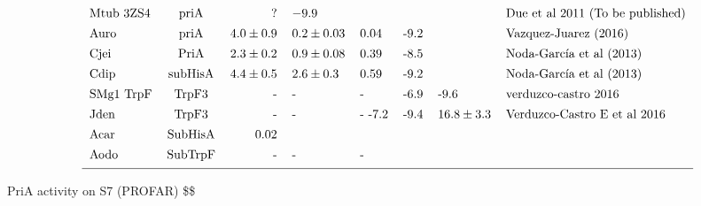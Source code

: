 \documentclass[12pt,twoside]{reedthesis}
\begin{document}
\[\begin{tabular}{ l c r l l l l l}
  Mtub 3ZS4   &priA   &$  ?                 $&$-9.9               $&                      &       &          &Due et al 2011 (To be published)\\ [1ex]
  Auro        &priA   &$  4.0 \pm 0.9 $&$0.2 \pm 0.03   $&0.04                    &-9.2       &          &Vazquez-Juarez (2016)\\ [1ex]
  Cjei        &PriA   &$  2.3 \pm 0.2 $&$0.9 \pm 0.08   $&0.39                    &-8.5       &          &Noda-García et al (2013)\\ [1ex]
  Cdip        &subHisA&$  4.4 \pm 0.5 $&$2.6 \pm 0.3      $&0.59                  &-9.2       &          &Noda-García et al (2013)\\ [1ex]
  SMg1 TrpF   &TrpF3  &   -                &-                &-                       &-6.9     &-9.6      &verduzco-castro 2016\\ [1ex]
  Jden        &TrpF3  &   -                &-                &-          -7.2         &-9.4     &$16.8\pm3.3$&    Verduzco-Castro E et al  2016\\ [1ex]
  Acar      &SubHisA& 0.02                     &                 &                        &       &          &            \\ [1ex]
  Aodo        &SubTrpF&       -              &-                  &-                     &       &          &\\ [1ex]
  \hline
  \end{tabular}
  \label{table:name}
  \]
  
  PriA activity on S7 (PROFAR) \$\$ \centering 
  
\end{document}

